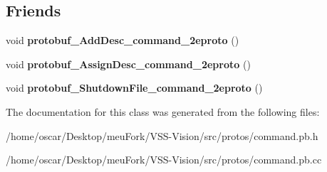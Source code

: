 \subsection*{Friends}
\begin{DoxyCompactItemize}
\item 
\hypertarget{classvss__command_1_1Global__Commands_a4825d92f856fcb4b02c67b601c433796}{void {\bfseries protobuf\-\_\-\-Add\-Desc\-\_\-command\-\_\-2eproto} ()}\label{classvss__command_1_1Global__Commands_a4825d92f856fcb4b02c67b601c433796}

\item 
\hypertarget{classvss__command_1_1Global__Commands_a4c6fb97c25079d49daf010087d869100}{void {\bfseries protobuf\-\_\-\-Assign\-Desc\-\_\-command\-\_\-2eproto} ()}\label{classvss__command_1_1Global__Commands_a4c6fb97c25079d49daf010087d869100}

\item 
\hypertarget{classvss__command_1_1Global__Commands_a4cf10633ad46690f5eec6bdbbcf62de0}{void {\bfseries protobuf\-\_\-\-Shutdown\-File\-\_\-command\-\_\-2eproto} ()}\label{classvss__command_1_1Global__Commands_a4cf10633ad46690f5eec6bdbbcf62de0}

\end{DoxyCompactItemize}


The documentation for this class was generated from the following files\-:\begin{DoxyCompactItemize}
\item 
/home/oscar/\-Desktop/meu\-Fork/\-V\-S\-S-\/\-Vision/src/protos/command.\-pb.\-h\item 
/home/oscar/\-Desktop/meu\-Fork/\-V\-S\-S-\/\-Vision/src/protos/command.\-pb.\-cc\end{DoxyCompactItemize}

